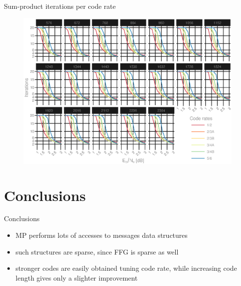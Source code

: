 \documentclass{beamer}
\begin{document}
\begin{darkframes}
  \begin{frame}{Sum-product iterations per code rate}
    \begin{figure}[h]
      \centering
      \vspace{-2mm}%
      \hspace{-6mm}%
      \includegraphics[width=1.05\textwidth]{figures/iters_vs_SNR_per_rate.eps}
    \end{figure}
  \end{frame}

  \section{Conclusions}
  \begin{frame}{Conclusions}
    \begin{itemize}
      \item MP performs lots of accesses to messages data structures
      \item such structures are sparse, since FFG is sparse as well
    \end{itemize}

    \begin{itemize}
      \item stronger codes are easily obtained tuning code rate, while increasing code length gives only a slighter improvement


    \end{itemize}
  \end{frame}
\end{darkframes}
\end{document}
